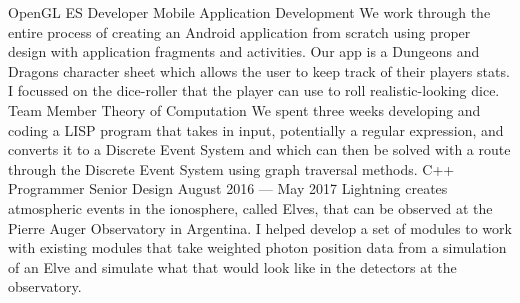 \begin{cventries}
  \cventry%
    {OpenGL ES Developer}
    {Mobile Application Development}
    {}
    {}
    {%
      We work through the entire process of creating an Android application from
      scratch using proper design with application fragments and activities. Our
      app is a Dungeons and Dragons character sheet which allows the user to
      keep track of their players stats. I focussed on the dice-roller that the
      player can use to roll realistic-looking dice.
    }
  \cventry%
    {Team Member}
    {Theory of Computation}
    {}
    {}
    {%
      We spent three weeks developing and coding a LISP program that takes in
      input, potentially a regular expression, and converts it to a Discrete
      Event System and which can then be solved with a route through the
      Discrete Event System using graph traversal methods.
    }
  \cventry%
    {C++ Programmer}
    {Senior Design}
    {}
    {August 2016 --- May 2017}
    {%
      Lightning creates atmospheric events in the ionosphere, called Elves, that
      can be observed at the Pierre Auger Observatory in Argentina. I helped
      develop a set of modules to work with existing modules that take weighted
      photon position data from a simulation of an Elve and simulate what that
      would look like in the detectors at the observatory.
    }
\end{cventries}
